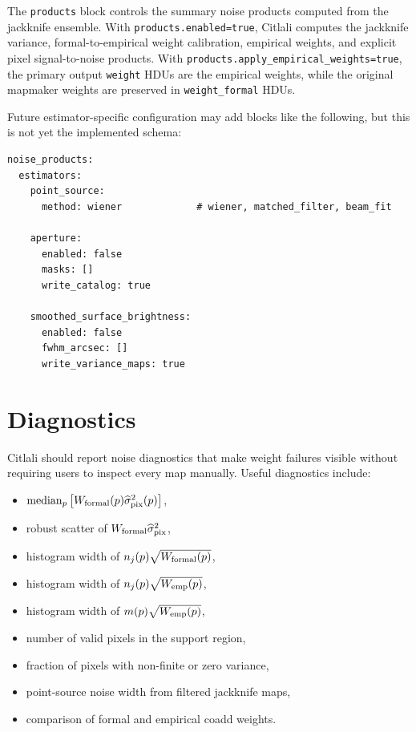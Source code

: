 \documentclass[11pt]{article}
\newcommand{\median}{\operatorname{median}}
\begin{document}
The \texttt{products} block controls the summary noise products computed from
the jackknife ensemble. With \texttt{products.enabled=true}, Citlali computes
the jackknife variance, formal-to-empirical weight calibration, empirical
weights, and explicit pixel signal-to-noise products. With
\texttt{products.apply\_empirical\_weights=true}, the primary output
\texttt{weight} HDUs are the empirical weights, while the original mapmaker
weights are preserved in \texttt{weight\_formal} HDUs.

Future estimator-specific configuration may add blocks like the following, but
this is not yet the implemented schema:

\begin{lstlisting}
noise_products:
  estimators:
    point_source:
      method: wiener             # wiener, matched_filter, beam_fit

    aperture:
      enabled: false
      masks: []
      write_catalog: true

    smoothed_surface_brightness:
      enabled: false
      fwhm_arcsec: []
      write_variance_maps: true
\end{lstlisting}

\section{Diagnostics}

Citlali should report noise diagnostics that make weight failures visible
without requiring users to inspect every map manually. Useful diagnostics
include:

\begin{itemize}[leftmargin=1.5em]
\item \(\median_p\left[
  W_{\rm formal}(p)\widehat{\sigma}^2_{\rm pix}(p)
\right]\),
\item robust scatter of \(W_{\rm formal}\widehat{\sigma}^2_{\rm pix}\),
\item histogram width of \(n_j(p)\sqrt{W_{\rm formal}(p)}\),
\item histogram width of \(n_j(p)\sqrt{W_{\rm emp}(p)}\),
\item histogram width of \(m(p)\sqrt{W_{\rm emp}(p)}\),
\item number of valid pixels in the support region,
\item fraction of pixels with non-finite or zero variance,
\item point-source noise width from filtered jackknife maps,
\item comparison of formal and empirical coadd weights.
\end{itemize}
\end{document}
